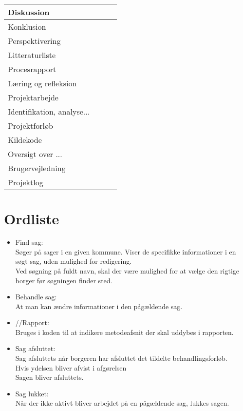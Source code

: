\begin{center}
\begin{longtable}{|m{5cm}|m{4cm}|m{4cm}|m{3cm}|}
Diskussion & & & \\ \hline

Konklusion & & & \\ \hline

Perspektivering & & & \\ \hline

Litteraturliste & & & \\ \hline

Procesrapport & & & \\ \hline
Læring og refleksion & & & \\ \hline
Projektarbejde & & & \\ \hline
Identifikation, analyse... & & & \\ \hline
Projektforløb & & & \\ \hline

Kildekode & & & \\ \hline
Oversigt over ... & & & \\ \hline

Brugervejledning & & & \\ \hline

Projektlog & & & \\ \hline


\end{longtable}
\end{center}

\section{Ordliste}

\begin{itemize}
\renewcommand\labelitemi{--}
\item Find sag: \\
Søger på sager i en given kommune. Viser de specifikke informationer i en søgt sag, uden mulighed for redigering. \\
Ved søgning på fuldt navn, skal der være mulighed for at vælge den rigtige borger før søgningen finder sted.
\item Behandle sag: \\
At man kan ændre informationer i den pågældende sag.
\item //Rapport: \\
Bruges i koden til at indikere metodeafsnit der skal uddybes i rapporten.
\item Sag afsluttet: \\
Sag afsluttets når borgeren har afsluttet det tildelte behandlingsforløb. \\
Hvis ydelsen bliver afvist i afgørelsen \\
Sagen bliver afsluttets.
\item Sag lukket: \\
Når der ikke aktivt bliver arbejdet på en pågældende sag, lukkes sagen.
\end{itemize}

